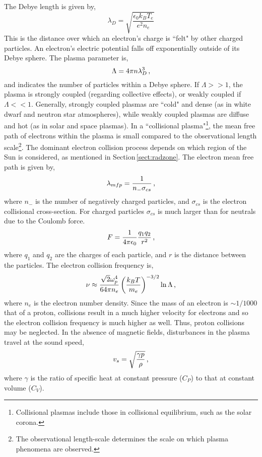 The Debye length is given by,
\begin{equation}
\lambda_D = \sqrt{\frac{\epsilon_0 k_B T_e}{e^2 n_e}}  
\end{equation}
This is the distance over which an electron's charge is ``felt" by other charged particles. An electron's electric potential falls off exponentially outside of its Debye sphere. The plasma parameter is, 
\begin{equation}
\Lambda = 4 \pi n \lambda_D^3 \mbox{\,,}
\end{equation}
and indicates the number of particles within a Debye sphere. If $\Lambda >> 1$, the plasma is strongly coupled (regarding collective effects), or weakly coupled if $\Lambda << 1$. Generally, strongly coupled plasmas are ``cold" and dense (as in white dwarf and neutron star atmospheres), while weakly coupled plasmas are diffuse and hot (as in solar and space plasmas).
In a ``collisional plasma"\footnote{Collisional plasmas include those in collisional equilibrium, such as the solar corona.}, the mean free path of electrons within the plasma is small compared to the observational length scale\footnote{The observational length-scale determines the scale on which plasma phenomena are observed.}. The dominant electron collision process depends on which region of the Sun is considered, as mentioned in Section\,\ref{sect:radzone}. 
The electron mean free path is given by,
\begin{equation}
\lambda_{mfp} = \frac{1}{n_- \sigma_{cs}} \mbox{\,,}
\end{equation}
where $n_-$ is the number of negatively charged particles, and $\sigma_{cs}$ is the electron collisional cross-section. For charged particles $\sigma_{cs}$ is much larger than for neutrals due to the Coulomb force. 
\begin{equation}
F = \frac{1}{4\pi \epsilon_0}\frac{q_1 q_2}{r^2} \mbox{\,,}
\end{equation}
where $q_1$ and $q_2$ are the charges of each particle, and $r$ is the distance between the particles.
The electron collision frequency is,
\begin{equation}
\nu \approx \frac{\sqrt{2} \omega_p^4}{64 \pi n_e} \left( \frac{k_B T}{m_e} \right)^{-3/2} \ln \Lambda \mbox{\,,}
\end{equation}
where $n_e$ is the electron number density. Since the mass of an electron is $\sim$$1/1000$ that of a proton, collisions result in a much higher velocity for electrons and so the electron collision frequency is much higher as well. Thus, proton collisions may be neglected.
In the absence of magnetic fields, disturbances in the plasma travel at the sound speed,
\begin{equation}
v_s = \sqrt{\frac{\gamma p}{\rho}} \mbox{\,,}
\end{equation}
where $\gamma$ is the ratio of specific heat at constant pressure ($C_P$) to that at constant volume ($C_V$).


